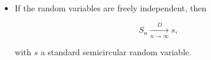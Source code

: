 \begin{theorem}
\begin{itemize}
            
            \item If the random variables are freely independent, then 
                
            \begin{equation*}
            S_n \xrightarrow[n\to\infty]{D} s,        
            \end{equation*}

            \noindent with $s$ a standard semicircular random variable.
        \end{itemize}
    \end{theorem}

